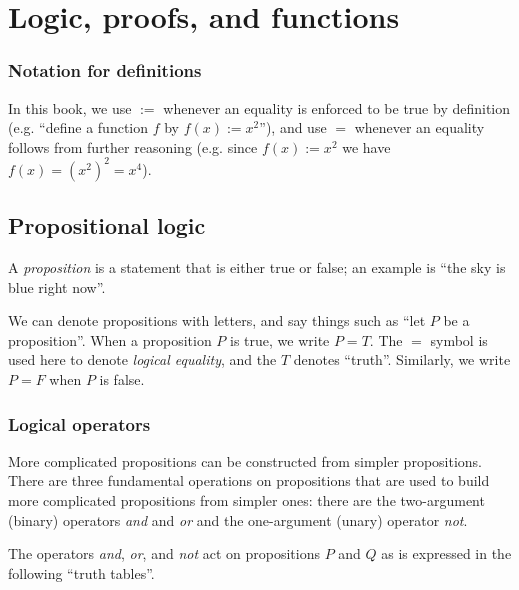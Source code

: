 \chapter{Logic, proofs, and functions}
\label{ch::logic_pf_fns}

\subsection*{Notation for definitions}

In this book, we use $:=$ whenever an equality is enforced to be true by definition (e.g. ``define a function $f$ by $f(x) := x^2$''), and use $=$ whenever an equality follows from further reasoning (e.g. since $f(x) := x^2$ we have $f(x) = (x^2)^2 = x^4$).

\section{Propositional logic}

A \textit{proposition} is a statement that is either true or false; an example is ``the sky is blue right now''.

We can denote propositions with letters, and say things such as ``let $P$ be a proposition''. When a proposition $P$ is true, we write $P = T$. The $=$ symbol is used here to denote \textit{logical equality}, and the $T$ denotes ``truth''. Similarly, we write $P = F$ when $P$ is false.

\subsection*{Logical operators}

More complicated propositions can be constructed from simpler propositions. There are three fundamental operations on propositions that are used to build more complicated propositions from simpler ones: there are the two-argument (binary) operators \textit{and} and \textit{or} and the one-argument (unary) operator \textit{not}.

The operators \textit{and}, \textit{or}, and \textit{not} act on propositions $P$ and $Q$ as is expressed in the following ``truth tables''.

